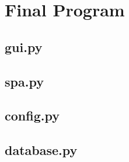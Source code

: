 \chapter{Final Program}

\section{gui.py}

\section{spa.py}

\section{config.py}

\section{database.py}

